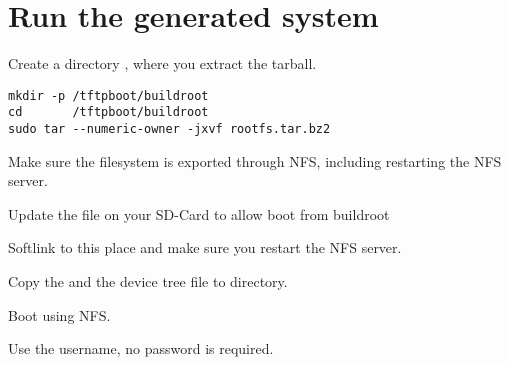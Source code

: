 \section{Run the generated system}

Create a directory , where you extract the tarball.

\begin{verbatim}
mkdir -p /tftpboot/buildroot
cd       /tftpboot/buildroot
sudo tar --numeric-owner -jxvf rootfs.tar.bz2
\end{verbatim}

Make sure the filesystem is exported through NFS, including restarting the NFS server.

Update the  file on your SD-Card to allow boot from buildroot

Softlink  to this place and make sure you restart the NFS server.

Copy the  and the device tree file to 
directory.

Boot using NFS.

Use the  username, no password is required.





